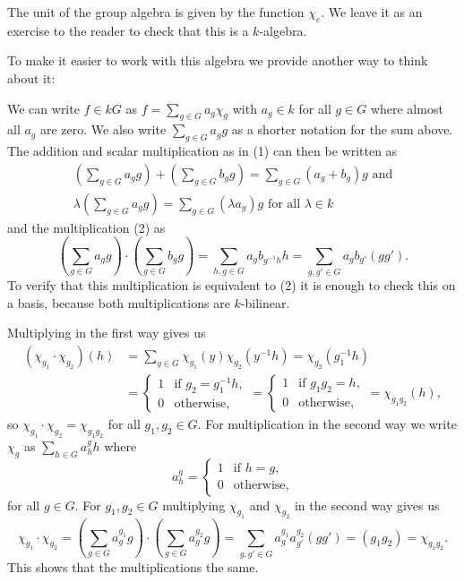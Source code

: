 The unit of the group algebra is given by the function $\chi_e$. We leave it as an exercise to the reader to check that this is a $k$-algebra.

To make it easier to work with this algebra we provide another way to think about it:

We can write $f \in kG$ as $f = \sum_{g \in G} a_g \chi_g$ with $a_g \in k$ for all $g \in G$ where almost all $a_g$ are zero. We also write $\sum_{g \in G} a_g g$ as a shorter notation for the sum above. The addition and scalar multiplication as in (1) can then be written as
\begin{gather*}
  \left( \sum_{g \in G} a_g g \right) + \left( \sum_{g \in G} b_g g \right) = \sum_{g \in G} (a_g+b_g) g \text{ and}\\
  \lambda \left( \sum_{g \in G} a_g g \right) = \sum_{g \in G} (\lambda a_g) g \text{ for all } \lambda \in k
\end{gather*}
and the multiplication (2) as
\[
  \left( \sum_{g \in G} a_g g \right) \cdot \left( \sum_{g \in G} b_g g \right)
  = \sum_{h, g \in G} a_g b_{g^{-1}h} h
  = \sum_{g, g' \in G} a_g b_{g'} (g g').
\]
To verify that this multiplication is equivalent to (2) it is enough to check this on a basis, because both multiplications are $k$-bilinear.

Multiplying in the first way gives us
\begin{align*}
  \left( \chi_{g_1} \cdot \chi_{g_2} \right)(h)
  &= \sum_{y \in G} \chi_{g_1}(y) \chi_{g_2}\left(y^{-1} h\right)
  = \chi_{g_2}\left(g_1^{-1}h\right) \\
  &= \begin{cases} 1 & \text{if } g_2 = g_1^{-1}h, \\ 0 & \text{otherwise}, \end{cases}
  = \begin{cases} 1 & \text{if } g_1 g_2 = h, \\ 0 & \text{otherwise}, \end{cases}
  = \chi_{g_1 g_2}(h),
\end{align*}
so $\chi_{g_1} \cdot \chi_{g_2} = \chi_{g_1 g_2}$ for all $g_1, g_2 \in G$.
For multiplication in the second way we write $\chi_g$ as $\sum_{h \in G} a^g_h h$ where
\[
  a^g_h = \begin{cases} 1 & \text{if } h = g, \\ 0 & \text{otherwise}, \end{cases}
\]
for all $g \in G$. For $g_1, g_2 \in G$ multiplying $\chi_{g_1}$ and $\chi_{g_2}$ in the second way gives us
\[
  \chi_{g_1} \cdot \chi_{g_2}
  = \left( \sum_{g \in G} a^{g_1}_g g \right) \cdot \left( \sum_{g \in G} a^{g_2}_g g \right)
  = \sum_{g,g' \in G} a^{g_1}_g a^{g_2}_{g'} (g g')
  = (g_1 g_2)
  = \chi_{g_1 g_2}.
\]
This shows that the multiplications the same.

